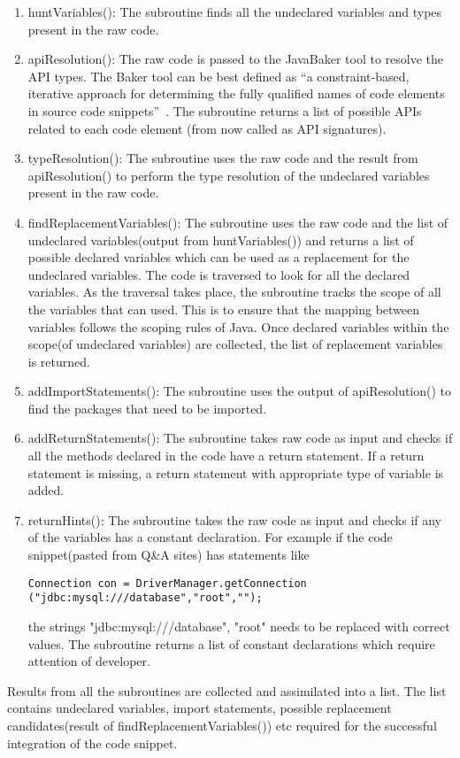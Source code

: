 \begin{enumerate}
\item huntVariables(): The subroutine finds all the undeclared variables and types present in the raw code.
\item apiResolution():  The raw code is passed to  the  JavaBaker tool to resolve the API types. The Baker tool can be best defined as ``a constraint-based, iterative approach for determining the fully qualified names of code elements in source code snippets''~\cite{subramanian2014live}. The subroutine returns a list of possible APIs related to each code element (from now called as API signatures). 
\item typeResolution(): The subroutine uses the raw code and the result from apiResolution() to perform the type resolution of the undeclared variables present in the raw code. 
\item findReplacementVariables(): The subroutine uses the raw code and the list of undeclared variables(output from huntVariables()) and returns a list of possible declared variables which can be used as a replacement for the undeclared variables. The code is traversed to look for all the declared variables. As the traversal takes place, the subroutine tracks the scope of all the variables that can used. This is to ensure that the mapping between variables follows the scoping rules of Java. Once declared variables within the scope(of undeclared variables) are collected, the list of replacement variables is returned.
\item addImportStatements(): The subroutine uses the output of apiResolution() to find the packages that need to be imported.
\item addReturnStatements(): The subroutine takes raw code as input and checks if all the methods declared in the code have a return statement. If a return statement is missing, a return statement with appropriate type of variable is added.
\item returnHints(): The subroutine takes the raw code as input and checks if any of the variables has a constant declaration. For example if the code snippet(pasted from Q\&A sites) has statements like 
\begin{lstlisting}[style=javastyle]
Connection con = DriverManager.getConnection ("jdbc:mysql:///database","root","");
\end{lstlisting}

the strings "jdbc:mysql:///database", "root" needs to be replaced with correct values. The subroutine returns a list of constant declarations which require attention of developer. 
\end{enumerate}
Results from all the subroutines are collected and assimilated into a list. The list contains undeclared variables, import statements, possible replacement candidates(result of findReplacementVariables())  etc required for the successful integration of the code snippet.


